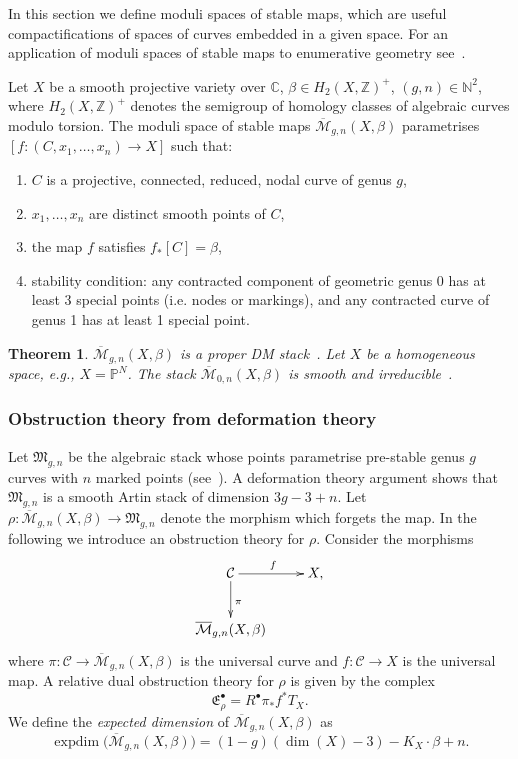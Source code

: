 \documentclass[pdftex]{sigma}
\numberwithin{equation}{section}
\newtheorem{Theorem}{Theorem}[section]
\newcommand{\E}{\mathfrak E}
\newcommand{\PP}{\mathbb P}
\newcommand{\MM}[4]{\overline{\mathcal M}_{#1,#2}(#3,#4)}
\begin{document}
In this section we define moduli spaces of stable maps, which are useful compactifications of spaces of curves embedded in a given space. For an application of moduli spaces of stable maps to enumerative geometry see~\cite{k}.
\begin{Definition}[\cite{k}] Let $X$ be a smooth projective variety over $\mathbb C$, $\beta\in H_2(X,\mathbb Z)^+$, $(g,n)\in\mathbb N^2$, where $H_2(X,\mathbb Z)^+$ denotes the semigroup of homology classes of algebraic curves modulo torsion. The moduli space of stable maps $\MM{g}{n}{X}{\beta}$ parametrises $[f\colon (C,x_1,\ldots,x_n)\to X]$ such that:
\begin{enumerate}\itemsep=0pt
\item[(1)] $C$ is a projective, connected, reduced, nodal curve of genus $g$,
\item[(2)] $x_1,\ldots,x_n$ are distinct smooth points of $C$,
\item[(3)] the map $f$ satisfies $f_*[C]=\beta$,
\item[(4)] stability condition: any contracted component of geometric genus 0 has at least 3 special points (i.e. nodes or markings), and any contracted curve of genus 1 has at least 1 special point.
\end{enumerate}
\end{Definition}

\begin{Theorem}
 $\MM{g}{n}{X}{\beta}$ is a proper DM stack~{\rm \cite{k}}. Let $X$ be a homogeneous space, e.g., $X=\PP^N$. The stack $\MM{0}{n}{X}{\beta}$ is smooth and irreducible~{\rm \cite{FP}}.
\end{Theorem}

\subsubsection{Obstruction theory from deformation theory} \label{obsdefth}
Let $\mathfrak M_{g,n}$ be the algebraic stack whose points parametrise pre-stable genus $g$ curves with $n$ marked points (see~\cite{Ber}). A deformation theory argument shows that $\mathfrak M_{g,n}$ is a smooth Artin stack of dimension $3g-3+n$. Let $\rho\colon \MM{g}{n}{X}{\beta}\to \mathfrak M_{g,n}$ denote the morphism which forgets the map. In the following we introduce an obstruction theory for $\rho$.
Consider the morphisms
\[\xymatrix{\mathcal C\ar[r]^f\ar[d]^{\pi} & X,\\
				\overline{\mathcal{M}}_{g,n}(X,\beta)}\]
where $\pi\colon \mathcal C\to \MM{g}{n}{X}{\beta}$ is the universal curve and $f\colon \mathcal{C}\to X$ is the universal map.
A relative dual obstruction theory for $\rho$ is given by the complex
\begin{equation}\label{mapsobs}\E^{\bullet}_{\rho}=R^{\bullet}\pi_* f^*T_X.
\end{equation}
We define the \emph{expected dimension} of $\MM{g}{n}{X}{\beta}$ as
\[
 \operatorname{expdim}\big(\MM{g}{n}{X}{\beta}\big)=(1-g)(\dim(X)-3)-K_X\cdot\beta+n.
\]
\end{document}
